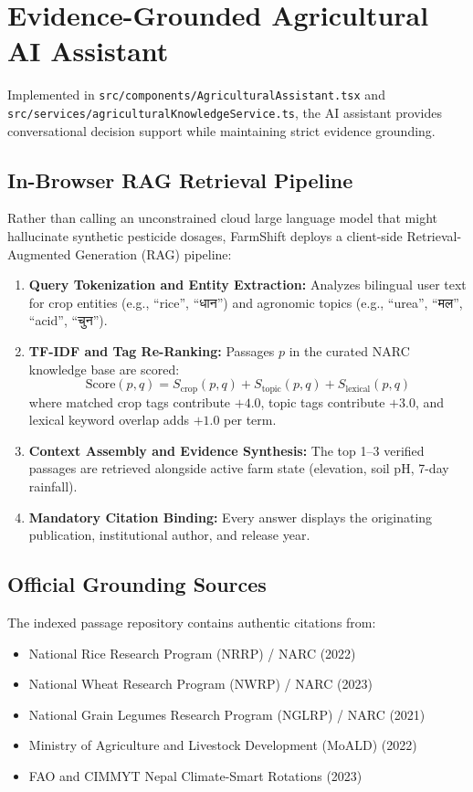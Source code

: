 \documentclass[11pt,a4paper]{report}
\begin{document}
\chapter{Evidence-Grounded Agricultural AI Assistant}

Implemented in \texttt{src/components/AgriculturalAssistant.tsx} and \texttt{src/services/agriculturalKnowledgeService.ts}, the AI assistant provides conversational decision support while maintaining strict evidence grounding.

\section{In-Browser RAG Retrieval Pipeline}
Rather than calling an unconstrained cloud large language model that might hallucinate synthetic pesticide dosages, FarmShift deploys a client-side Retrieval-Augmented Generation (RAG) pipeline:
\begin{enumerate}
  \item \textbf{Query Tokenization and Entity Extraction:} Analyzes bilingual user text for crop entities (e.g., ``rice'', ``धान'') and agronomic topics (e.g., ``urea'', ``मल'', ``acid'', ``चुन'').
  \item \textbf{TF-IDF and Tag Re-Ranking:} Passages $p$ in the curated NARC knowledge base are scored:
  \begin{equation}
    \text{Score}(p, q) = S_{\text{crop}}(p, q) + S_{\text{topic}}(p, q) + S_{\text{lexical}}(p, q)
  \end{equation}
  where matched crop tags contribute $+4.0$, topic tags contribute $+3.0$, and lexical keyword overlap adds $+1.0$ per term.
  \item \textbf{Context Assembly and Evidence Synthesis:} The top 1--3 verified passages are retrieved alongside active farm state (elevation, soil pH, 7-day rainfall).
  \item \textbf{Mandatory Citation Binding:} Every answer displays the originating publication, institutional author, and release year.
\end{enumerate}

\section{Official Grounding Sources}
The indexed passage repository contains authentic citations from:
\begin{itemize}
  \item National Rice Research Program (NRRP) / NARC (2022) \cite{narc2022rice}
  \item National Wheat Research Program (NWRP) / NARC (2023) \cite{narc2023wheat}
  \item National Grain Legumes Research Program (NGLRP) / NARC (2021) \cite{narc2021legumes}
  \item Ministry of Agriculture and Livestock Development (MoALD) (2022) \cite{moald2022fertilizer}
  \item FAO and CIMMYT Nepal Climate-Smart Rotations (2023) \cite{faocimmyt2023}
\end{itemize}
\end{document}
